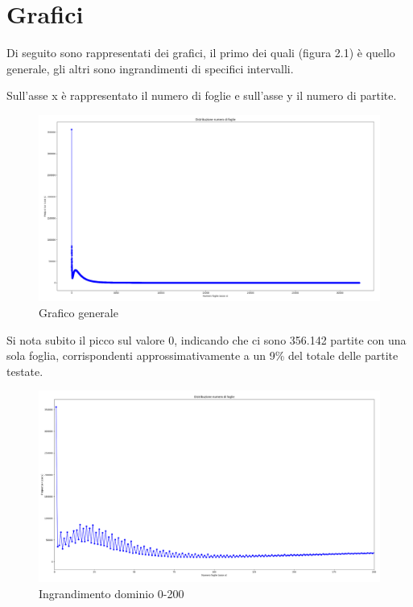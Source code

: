 \documentclass[a4paper,12pt]{report}
\begin{document}
\section{Grafici}

Di seguito sono rappresentati dei grafici, il primo dei quali (figura 2.1) è quello generale, gli altri sono ingrandimenti di specifici intervalli.

Sull'asse x è rappresentato il numero di foglie e sull'asse y il numero di partite.

\begin{figure}[h!]
    \centering
    \includegraphics[width=1\textwidth]{imgs/grafico_base.png} 
    \caption{Grafico generale}
    \label{fig:etichetta}
\end{figure}

Si nota subito il picco sul valore 0, indicando che ci sono 356.142 partite con una sola foglia, corrispondenti approssimativamente a un 9\% del totale delle partite testate.


\begin{figure}[h!]
    \centering
    \includegraphics[width=1\textwidth]{imgs/grafico_0_200.png} 
    \caption{Ingrandimento dominio 0-200}
    \label{fig:etichetta}
\end{figure}
\end{document}

